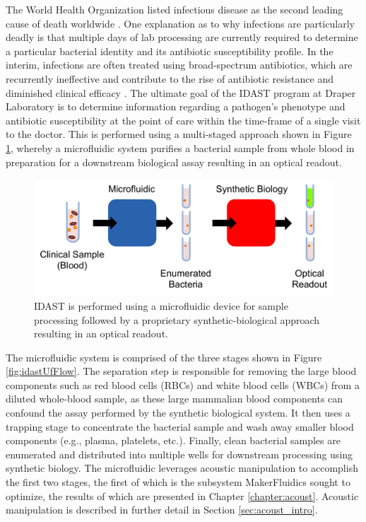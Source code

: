 The World Health Organization listed infectious disease as the second leading cause of death worldwide \cite{world2004world}. One explanation as to why infections are particularly deadly is that multiple days of lab processing are currently required to determine a particular bacterial identity and its antibiotic susceptibility profile. In the interim, infections are often treated using broad-spectrum antibiotics, which are recurrently ineffective and contribute to the rise of antibiotic resistance and diminished clinical efficacy \cite{laxminarayan2013antibiotic}. The ultimate goal of the IDAST program at Draper Laboratory is to determine information regarding a pathogen's phenotype and antibiotic susceptibility at the point of care within the time-frame of a single visit to the doctor. This is performed using a multi-staged approach shown in Figure \ref{fig:idastFlow}, whereby a microfluidic system purifies a bacterial sample from whole blood in preparation for a downstream biological assay resulting in an optical readout.

\begin{figure}[h]
  \begin{minipage}[t]{0.99\linewidth}\centering
    \includegraphics[width=13cm]{idastFlow.pdf}
    \medskip
  \end{minipage}\hfill
  \caption[System-level view of IDAST]{IDAST is performed using a microfluidic device for sample processing followed by a proprietary synthetic-biological approach resulting in an optical readout.}
    \label{fig:idastFlow}
\end{figure}

The microfluidic system is comprised of the three stages shown in Figure \ref{fig:idastUfFlow}. The separation step is responsible for removing the large blood components such as red blood cells (RBCs) and white blood cells (WBCs) from a diluted whole-blood sample, as these large mammalian blood components can confound the assay performed by the synthetic biological system. It then uses a trapping stage to concentrate the bacterial sample and wash away smaller blood components (e.g., plasma, platelets, etc.). Finally, clean bacterial samples are enumerated and distributed into multiple wells for downstream processing using synthetic biology. The microfluidic leverages acoustic manipulation to accomplish the first two stages, the first of which is the subsystem MakerFluidics sought to optimize, the results of which are presented in Chapter \ref{chapter:acoust}. Acoustic manipulation is described in further detail in Section \ref{sec:acoust_intro}.

